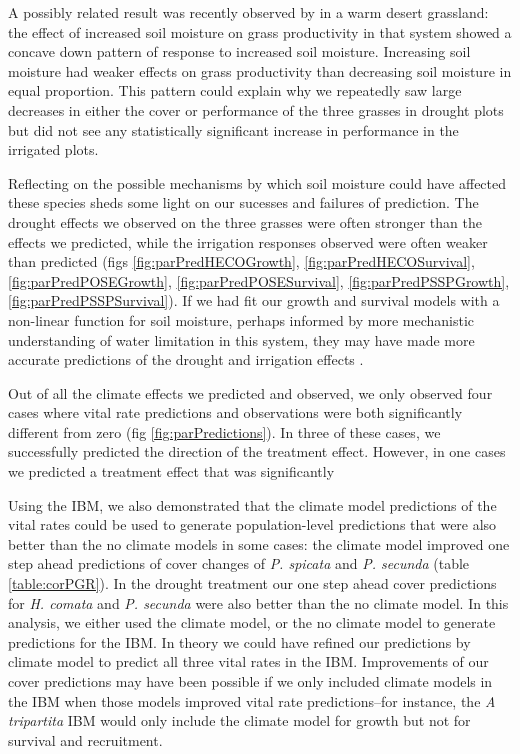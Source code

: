 \documentclass[11pt]{article}
\begin{document}
\begin{doublespacing}
A possibly related result was recently observed by \citep{gherardi_} in a warm desert grassland: the effect of increased soil moisture on grass productivity in that system showed a concave down pattern of response to increased soil moisture.  Increasing soil moisture had weaker effects on grass productivity than decreasing soil moisture in equal proportion. This pattern could explain why we repeatedly saw large decreases in either the cover or performance of the three grasses in drought plots but did not see any statistically significant increase in performance in the irrigated plots.  

Reflecting on the possible mechanisms by which soil moisture could have affected these species sheds some light on our sucesses and failures of prediction.  The drought effects we observed on the three grasses were often stronger than the effects we predicted, while the irrigation responses observed were often weaker than predicted (figs \ref{fig:parPredHECOGrowth}, \ref{fig:parPredHECOSurvival}, \ref{fig:parPredPOSEGrowth}, \ref{fig:parPredPOSESurvival}, \ref{fig:parPredPSSPGrowth}, \ref{fig:parPredPSSPSurvival}). If we had fit our growth and survival models with a non-linear function for soil moisture, perhaps informed by more mechanistic understanding of water limitation in this system, they may have made more accurate predictions of the drought and irrigation effects \citep{ehrlen_advancing_2016}.

Out of all the climate effects we predicted and observed, we only observed four cases where vital rate predictions and observations were both significantly different from zero (fig  \ref{fig:parPredictions}). In three of these cases, we successfully predicted the direction of the treatment effect. However, in one cases we predicted a treatment effect that was significantly  

Using the IBM, we also demonstrated that the climate model predictions of the vital rates could be used to generate population-level predictions that were also better than the no climate models in some cases: the climate model improved one step ahead predictions of cover changes of \textit{P. spicata} and \textit{P. secunda} (table \ref{table:corPGR}). In the drought treatment our one step ahead cover predictions for \textit{H. comata} and \textit{P. secunda} were also better than the no climate model. In this analysis, we either used the climate model, or the no climate model to generate predictions for the IBM. In theory we could have refined our predictions by  climate model to predict all three vital rates in the IBM. Improvements of our cover predictions may have been possible if we only included climate models in the IBM when those models improved vital rate predictions--for instance, the \textit{A tripartita} IBM would only include the climate model for growth but not for survival and recruitment.   


\end{doublespacing}
\end{document}
